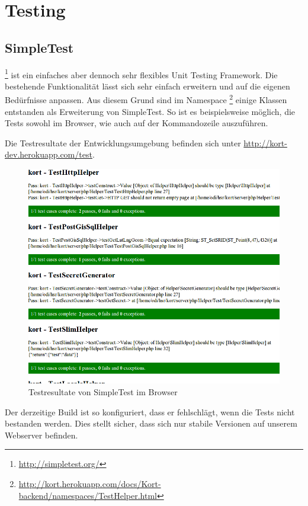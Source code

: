 \section{Testing}

\subsection{SimpleTest}
\footnote{\url{http://simpletest.org/}} ist ein einfaches aber dennoch sehr flexibles Unit Testing Framework.
Die bestehende Funktionalität lässt sich sehr einfach erweitern und auf die eigenen Bedürfnisse anpassen.
Aus diesem Grund sind im Namespace \footnote{\url{http://kort.herokuapp.com/docs/Kort-backend/namespaces/TestHelper.html}} einige Klassen entstanden als Erweiterung von SimpleTest.
So ist es beispielsweise möglich, die Tests sowohl im Browser, wie auch auf der Kommandozeile auszuführen.

Die Testresultate der Entwicklungsumgebung befinden sich unter \url{http://kort-dev.herokuapp.com/test}.

\begin{figure}[H]
	\centering
	\includegraphics[scale=0.5]{images/implementation/backend/simple-test}
	\caption{Testresultate von SimpleTest im Browser}
	\label{image-simple-test}
\end{figure}

Der derzeitige Build ist so konfiguriert, dass er fehlschlägt, wenn die Tests nicht bestanden werden.
Dies stellt sicher, dass sich nur stabile Versionen auf unserem Webserver befinden.


